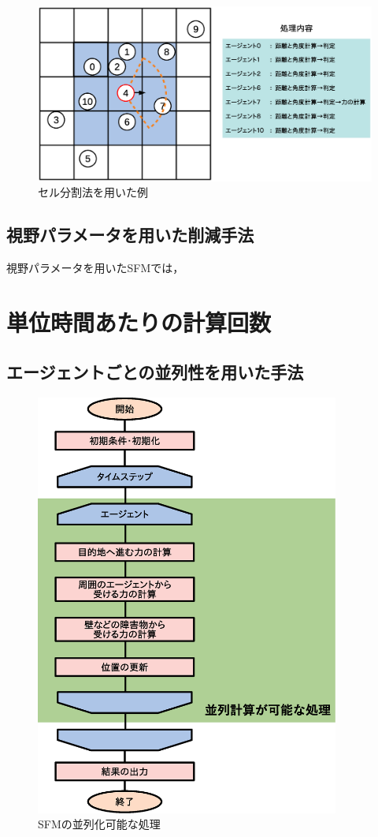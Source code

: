 \begin{figure}[hbtp]
 \begin{center}
  \includegraphics[width=11.5cm,clip]{figure/seru_ex1_r2.eps}
  \caption{セル分割法を用いた例}
  \label{fig:seru_ex1}
 \end{center}
\end{figure}


\subsection{視野パラメータを用いた削減手法}
視野パラメータを用いたSFMでは，


\section{単位時間あたりの計算回数}

\subsection{エージェントごとの並列性を用いた手法}

\begin{figure}[hp]
 \begin{center}
  \includegraphics[width=10cm,clip]{figure/heiretuka_sfm.eps}
  \caption{SFMの並列化可能な処理}
  \label{fig:atigenshou}
 \end{center}
\end{figure}

